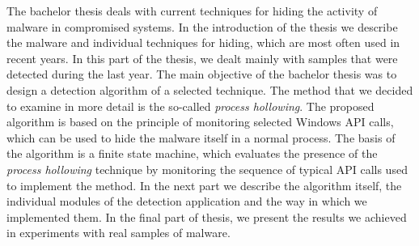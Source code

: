 The bachelor thesis deals with current techniques for hiding the activity of malware in compromised systems. In the introduction of the thesis we describe the malware and individual techniques for hiding, which are most often used in recent years. In this part of the thesis, we dealt mainly with samples that were detected during the last year. The main objective of the bachelor thesis was to design a detection algorithm of a selected technique. The method that we decided to examine in more detail is the so-called \textit {process hollowing}. The proposed algorithm is based on the principle of monitoring selected Windows API calls, which can be used to hide the malware itself in a normal process. The basis of the algorithm is a finite state machine, which evaluates the presence of the \textit {process hollowing} technique by monitoring the sequence of typical API calls used to implement the method. In the next part we describe the algorithm itself, the individual modules of the detection application and the way in which we implemented them. In the final part of thesis, we present the results we achieved in experiments with real samples of malware.
